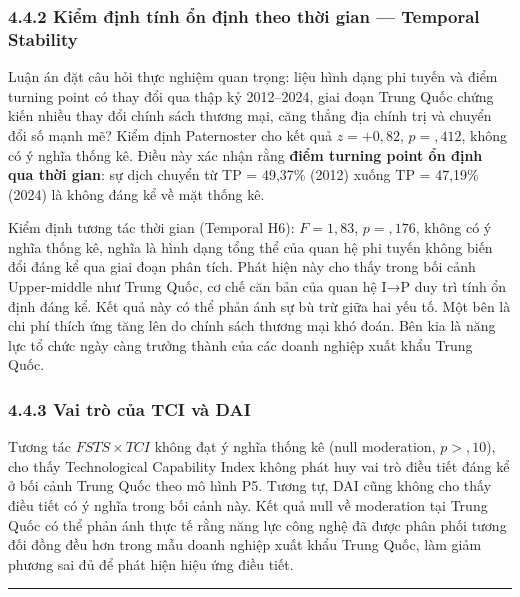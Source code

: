 \documentclass[12pt,a4paper]{article}
\begin{document}
\hypertarget{442-kiux1ec3m-ux111ux1ecbnh-tuxednh-ux1ed5n-ux111ux1ecbnh-theo-thux1eddi-gian--temporal-stability}{%
\subsubsection{4.4.2 Kiểm định tính ổn định theo thời gian --- Temporal
Stability}\label{442-kiux1ec3m-ux111ux1ecbnh-tuxednh-ux1ed5n-ux111ux1ecbnh-theo-thux1eddi-gian--temporal-stability}}

Luận án đặt câu hỏi thực nghiệm quan trọng: liệu hình dạng phi tuyến và
điểm turning point có thay đổi qua thập kỷ 2012--2024, giai đoạn Trung
Quốc chứng kiến nhiều thay đổi chính sách thương mại, căng thẳng địa
chính trị và chuyển đổi số mạnh mẽ? Kiểm định Paternoster cho kết quả
\(z = +0{,}82\), \(p = {,}412\), không có ý nghĩa thống kê. Điều này xác
nhận rằng \textbf{điểm turning point ổn định qua thời gian}: sự dịch
chuyển từ TP = 49,37\% (2012) xuống TP = 47,19\% (2024) là không đáng kể
về mặt thống kê.

Kiểm định tương tác thời gian (Temporal H6): \(F = 1{,}83\),
\(p = {,}176\), không có ý nghĩa thống kê, nghĩa là hình dạng tổng thể
của quan hệ phi tuyến không biến đổi đáng kể qua giai đoạn phân tích.
Phát hiện này cho thấy trong bối cảnh Upper-middle như Trung Quốc, cơ
chế căn bản của quan hệ I→P duy trì tính ổn định đáng kể. Kết quả này có
thể phản ánh sự bù trừ giữa hai yếu tố. Một bên là chi phí thích ứng
tăng lên do chính sách thương mại khó đoán. Bên kia là năng lực tổ chức
ngày càng trưởng thành của các doanh nghiệp xuất khẩu Trung Quốc.

\hypertarget{443-vai-truxf2-cux1ee7a-tci-vuxe0-dai}{%
\subsubsection{4.4.3 Vai trò của TCI và
DAI}\label{443-vai-truxf2-cux1ee7a-tci-vuxe0-dai}}

Tương tác \(FSTS \times TCI\) không đạt ý nghĩa thống kê (null
moderation, \(p > {,}10\)), cho thấy Technological Capability Index
không phát huy vai trò điều tiết đáng kể ở bối cảnh Trung Quốc theo mô
hình P5. Tương tự, DAI cũng không cho thấy điều tiết có ý nghĩa trong
bối cảnh này. Kết quả null về moderation tại Trung Quốc có thể phản ánh
thực tế rằng năng lực công nghệ đã được phân phối tương đối đồng đều hơn
trong mẫu doanh nghiệp xuất khẩu Trung Quốc, làm giảm phương sai đủ để
phát hiện hiệu ứng điều tiết.

\begin{center}\rule{0.5\linewidth}{0.5pt}\end{center}
\end{document}
